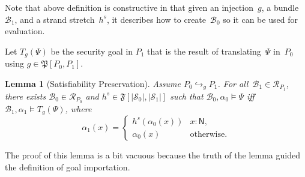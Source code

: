 \documentclass[12pt]{article}
\newtheorem{lem}[thm]{Lemma}
\newcommand{\srt}[1]{\ensuremath{\mathsf{#1}}}
\newcommand{\typ}{\mathbin:}
\newcommand{\alg}[1]{\ensuremath{\mathfrak{#1}}}
\newcommand{\ssp}{\ensuremath{\mathcal{S}}}
\newcommand{\bun}{\ensuremath{\mathcal{B}}}
\newcommand{\run}{\mathcal{R}}
\begin{document}
Note that above definition is constructive in that given an
injection~$g$, a bundle~$\bun_1$, and a strand stretch~$h^s$, it
describes how to create~$\bun_0$ so it can be used for evaluation.

Let $T_g(\Psi)$ be the security goal in $P_1$ that is the result of
translating~$\Psi$ in~$P_0$ using $g\in\alg{P}[P_0,P_1]$.

\begin{lem}[Satisfiability Preservation]
\label{lem:satisfiability preservation}
Assume $P_0\hookrightarrow_g P_1$.  For all~$\bun_1\in\run_{P_1}$,
there exists $\bun_0\in\run_{P_0}$ and $h^s\in\alg{F}[|\ssp_0|,
  |\ssp_1|]$ such that $\bun_0,\alpha_0\models\Psi$ iff
$\bun_1,\alpha_1\models T_g(\Psi)$, where
\[\alpha_1(x)=\left\{
\begin{array}{ll}
h^s(\alpha_0(x))&x\typ\srt{N},\\
\alpha_0(x)&\mbox{otherwise.}
\end{array}\right.\]

\end{lem}

The proof of this lemma is a bit vacuous because the truth of the
lemma guided the definition of goal importation.
\end{document}
